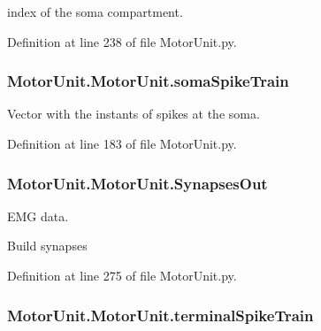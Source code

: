 index of the soma compartment. 



Definition at line 238 of file Motor\+Unit.\+py.

\subsubsection[{\texorpdfstring{soma\+Spike\+Train}{somaSpikeTrain}}]{\setlength{\rightskip}{0pt plus 5cm}Motor\+Unit.\+Motor\+Unit.\+soma\+Spike\+Train}\hypertarget{class_motor_unit_1_1_motor_unit_a8c86d98daa6c509e226ab165fa92515f}{}\label{class_motor_unit_1_1_motor_unit_a8c86d98daa6c509e226ab165fa92515f}


Vector with the instants of spikes at the soma. 



Definition at line 183 of file Motor\+Unit.\+py.

\subsubsection[{\texorpdfstring{Synapses\+Out}{SynapsesOut}}]{\setlength{\rightskip}{0pt plus 5cm}Motor\+Unit.\+Motor\+Unit.\+Synapses\+Out}\hypertarget{class_motor_unit_1_1_motor_unit_a898cd628506c666bf326b02436be0750}{}\label{class_motor_unit_1_1_motor_unit_a898cd628506c666bf326b02436be0750}


E\+MG data. 

Build synapses 

Definition at line 275 of file Motor\+Unit.\+py.

\subsubsection[{\texorpdfstring{terminal\+Spike\+Train}{terminalSpikeTrain}}]{\setlength{\rightskip}{0pt plus 5cm}Motor\+Unit.\+Motor\+Unit.\+terminal\+Spike\+Train}\hypertarget{class_motor_unit_1_1_motor_unit_a2e33990aaab69454943aa00db6b8d2eb}{}\label{class_motor_unit_1_1_motor_unit_a2e33990aaab69454943aa00db6b8d2eb}


